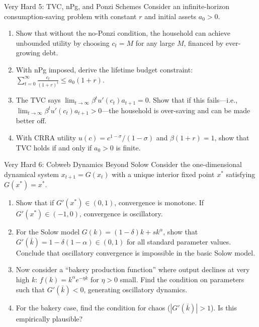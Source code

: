 \documentclass[aspectratio=169,10pt]{beamer}
\newcommand{\apxbutton}[1]{\hfill\hyperlink{#1}{\beamerbutton{Solution}}}
\begin{document}
\begin{frame}{Very Hard 5: TVC, nPg, and Ponzi Schemes}
\hypertarget{q-v5}{}
Consider an infinite-horizon consumption-saving problem with constant $r$ and initial assets $a_0>0$.

\begin{enumerate}
  \item Show that without the no-Ponzi condition, the household can achieve unbounded utility by choosing $c_t = M$ for any large $M$, financed by ever-growing debt.
  \item With nPg imposed, derive the lifetime budget constraint: $\sum_{t=0}^\infty \frac{c_t}{(1+r)^t} \leq a_0(1+r)$.
  \item The TVC says $\lim_{t\to\infty} \beta^t u'(c_t) a_{t+1} = 0$. Show that if this fails---i.e., $\lim_{t\to\infty} \beta^t u'(c_t) a_{t+1} > 0$---the household is over-saving and can be made better off.
  \item With CRRA utility $u(c)=c^{1-\sigma}/(1-\sigma)$ and $\beta(1+r)=1$, show that TVC holds if and only if $a_0 > 0$ is finite.
\end{enumerate}
\apxbutton{s-v5}
\end{frame}

\begin{frame}{Very Hard 6: Cobweb Dynamics Beyond Solow}
\hypertarget{q-v6}{}
Consider the one-dimensional dynamical system $x_{t+1} = G(x_t)$ with a unique interior fixed point $x^*$ satisfying $G(x^*)=x^*$.

\begin{enumerate}
  \item Show that if $G'(x^*) \in (0,1)$, convergence is monotone. If $G'(x^*) \in (-1,0)$, convergence is oscillatory.
  \item For the Solow model $G(k)=(1-\delta)k+sk^\alpha$, show that $G'(\bar{k})=1-\delta(1-\alpha) \in (0,1)$ for all standard parameter values. Conclude that oscillatory convergence is impossible in the basic Solow model.
  \item Now consider a ``bakery production function'' where output declines at very high $k$: $f(k)=k^\alpha e^{-\eta k}$ for $\eta>0$ small. Find the condition on parameters such that $G'(\bar{k})<0$, generating oscillatory dynamics.
  \item For the bakery case, find the condition for chaos ($|G'(\bar{k})|>1$). Is this empirically plausible?
\end{enumerate}
\apxbutton{s-v6}
\end{frame}
\end{document}

